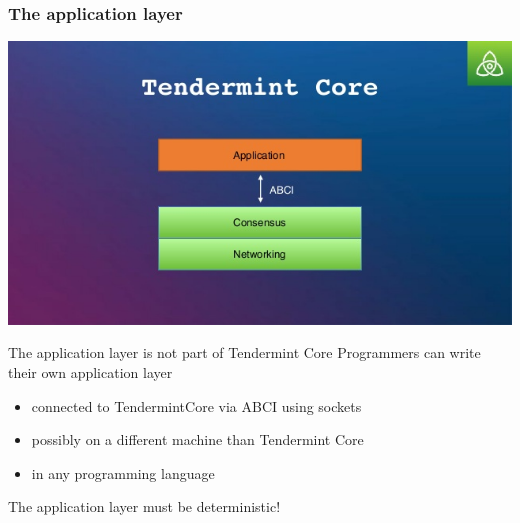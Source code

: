 \documentclass[11pt]{beamer}  %
\begin{document}
\begin{frame}\frametitle{The application layer}

  \begin{center}
    \includegraphics[scale=.15,clip=false]{pictures/tendermint-core.jpg}
  \end{center}
  
  \begin{greenbox}{The application layer is not part of Tendermint Core}
    Programmers can write their own application layer
    \begin{itemize}
    \item connected to TendermintCore via ABCI using sockets
    \item possibly on a different machine than Tendermint Core
    \item in any programming language
    \end{itemize}
  \end{greenbox}

  \bigskip

  \begin{redbox}{}
    \begin{center}
      The application layer must be deterministic!
    \end{center}
  \end{redbox}

\end{frame}
\end{document}
